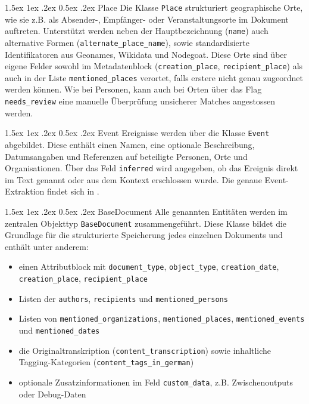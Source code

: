 \documentclass[12pt, a4paper, ngerman, bidi=default]{article}
\makeatletter
\newcommand{\code}[1]{\colorbox{VeryLightGray}{\texttt{#1}}} %
\let\oldparagraph\paragraph%
\renewcommand{\paragraph}{
    \@ifstar%
      \xxxParagraphStar%
      \xxxParagraphNoStar%
 }
\newcommand{\xxxParagraphStar}[1]{\oldparagraph*{#1}\mbox{}}
\newcommand{\xxxParagraphNoStar}[1]{\oldparagraph{#1}\mbox{}}
\renewcommand\paragraph{\@startsection{paragraph}{4}{0em}%
  {1.5ex \@plus1ex \@minus.2ex}%
  {0.5ex \@plus.2ex}%
  {\normalfont\normalsize\bfseries\itshape}}
\makeatother
\begin{document}
\paragraph{Place}
Die Klasse \code{Place} strukturiert geographische Orte, wie sie z.B. als Absender-, Empfänger- oder 
Veranstaltungsorte im Dokument auftreten. Unterstützt werden neben der Hauptbezeichnung (\code{name}) 
auch alternative Formen (\code{alternate\_place\_name}), sowie standardisierte Identifikatoren aus Geonames, 
Wikidata und Nodegoat. Diese Orte sind über eigene Felder sowohl im Metadatenblock (\code{creation\_place}, 
\code{recipient\_place}) als auch in der Liste \code{mentioned\_places} verortet, falls erstere nicht genau zugeordnet werden können. 
Wie bei Personen, kann auch bei Orten 
über das Flag \code{needs\_review} eine manuelle Überprüfung unsicherer Matches angestossen werden.

\paragraph{Event}
Ereignisse werden über die Klasse \code{Event} abgebildet. Diese enthält einen Namen, eine optionale Beschreibung, 
Datumsangaben und Referenzen auf beteiligte Personen, Orte und Organisationen. Über das Feld \code{inferred} wird angegeben, 
ob das Ereignis direkt im Text genannt oder aus dem Kontext erschlossen wurde. Die genaue Event-Extraktion findet sich 
in .

\paragraph{BaseDocument}
Alle genannten Entitäten werden im zentralen Objekttyp \code{BaseDocument} zusammengeführt. Diese Klasse bildet 
die Grundlage für die strukturierte Speicherung jedes einzelnen Dokuments und enthält unter anderem:
\begin{itemize}
\item einen Attributblock mit \code{document\_type}, \code{object\_type}, \code{creation\_date}, \code{creation\_place}, \code{recipient\_place}
\item Listen der \code{authors}, \code{recipients} und \code{mentioned\_persons}
\item Listen von \code{mentioned\_organizations}, \code{mentioned\_places}, \code{mentioned\_events} und \code{mentioned\_dates}
\item die Originaltranskription (\code{content\_transcription}) sowie inhaltliche Tagging-Kategorien (\code{content\_tags\_in\_german})
\item optionale Zusatzinformationen im Feld \code{custom\_data}, z.B. Zwischenoutputs oder Debug-Daten
\end{itemize}
\end{document}

